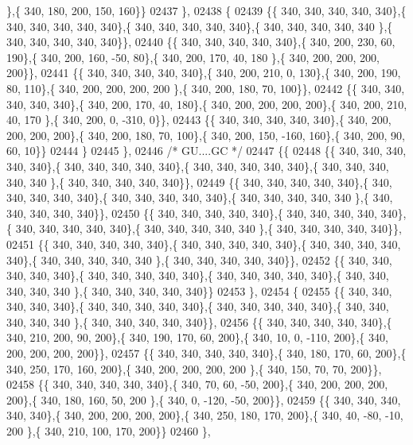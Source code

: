 \begin{DoxyCode}
      \},\{ 340, 180, 200, 150, 160\}\}
02437 \},
02438 \{
02439 \{\{ 340, 340, 340, 340, 340\},\{ 340, 340, 340, 340, 340\},\{ 340, 340, 340, 340, 340\},\{ 340, 340, 340, 340, 340
      \},\{ 340, 340, 340, 340, 340\}\},
02440 \{\{ 340, 340, 340, 340, 340\},\{ 340, 200, 230,  60, 190\},\{ 340, 200, 160, -50,  80\},\{ 340, 200, 170,  40, 180
      \},\{ 340, 200, 200, 200, 200\}\},
02441 \{\{ 340, 340, 340, 340, 340\},\{ 340, 200, 210,   0, 130\},\{ 340, 200, 190,  80, 110\},\{ 340, 200, 200, 200, 200
      \},\{ 340, 200, 180,  70, 100\}\},
02442 \{\{ 340, 340, 340, 340, 340\},\{ 340, 200, 170,  40, 180\},\{ 340, 200, 200, 200, 200\},\{ 340, 200, 210,  40, 170
      \},\{ 340, 200,   0, -310,   0\}\},
02443 \{\{ 340, 340, 340, 340, 340\},\{ 340, 200, 200, 200, 200\},\{ 340, 200, 180,  70, 100\},\{ 340, 200, 150, -160, 
      160\},\{ 340, 200,  90,  60,  10\}\}
02444 \}
02445 \},
02446 \textcolor{comment}{/* GU....GC */}
02447 \{\{
02448 \{\{ 340, 340, 340, 340, 340\},\{ 340, 340, 340, 340, 340\},\{ 340, 340, 340, 340, 340\},\{ 340, 340, 340, 340, 340
      \},\{ 340, 340, 340, 340, 340\}\},
02449 \{\{ 340, 340, 340, 340, 340\},\{ 340, 340, 340, 340, 340\},\{ 340, 340, 340, 340, 340\},\{ 340, 340, 340, 340, 340
      \},\{ 340, 340, 340, 340, 340\}\},
02450 \{\{ 340, 340, 340, 340, 340\},\{ 340, 340, 340, 340, 340\},\{ 340, 340, 340, 340, 340\},\{ 340, 340, 340, 340, 340
      \},\{ 340, 340, 340, 340, 340\}\},
02451 \{\{ 340, 340, 340, 340, 340\},\{ 340, 340, 340, 340, 340\},\{ 340, 340, 340, 340, 340\},\{ 340, 340, 340, 340, 340
      \},\{ 340, 340, 340, 340, 340\}\},
02452 \{\{ 340, 340, 340, 340, 340\},\{ 340, 340, 340, 340, 340\},\{ 340, 340, 340, 340, 340\},\{ 340, 340, 340, 340, 340
      \},\{ 340, 340, 340, 340, 340\}\}
02453 \},
02454 \{
02455 \{\{ 340, 340, 340, 340, 340\},\{ 340, 340, 340, 340, 340\},\{ 340, 340, 340, 340, 340\},\{ 340, 340, 340, 340, 340
      \},\{ 340, 340, 340, 340, 340\}\},
02456 \{\{ 340, 340, 340, 340, 340\},\{ 340, 210, 200,  90, 200\},\{ 340, 190, 170,  60, 200\},\{ 340,  10,   0, -110, 
      200\},\{ 340, 200, 200, 200, 200\}\},
02457 \{\{ 340, 340, 340, 340, 340\},\{ 340, 180, 170,  60, 200\},\{ 340, 250, 170, 160, 200\},\{ 340, 200, 200, 200, 200
      \},\{ 340, 150,  70,  70, 200\}\},
02458 \{\{ 340, 340, 340, 340, 340\},\{ 340,  70,  60, -50, 200\},\{ 340, 200, 200, 200, 200\},\{ 340, 180, 160,  50, 200
      \},\{ 340,   0, -120, -50, 200\}\},
02459 \{\{ 340, 340, 340, 340, 340\},\{ 340, 200, 200, 200, 200\},\{ 340, 250, 180, 170, 200\},\{ 340,  40, -80, -10, 200
      \},\{ 340, 210, 100, 170, 200\}\}
02460 \},

\end{DoxyCode}
